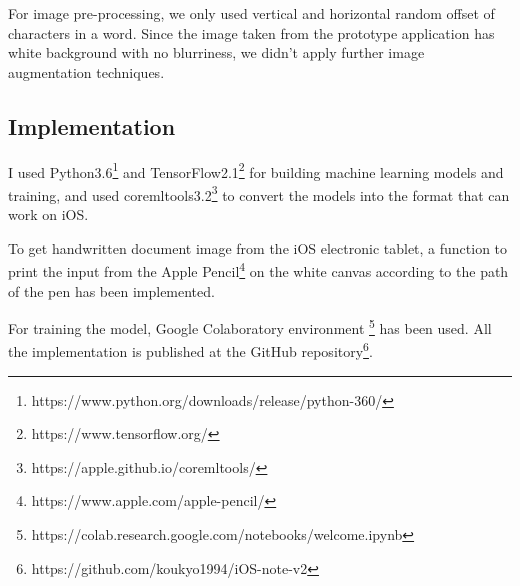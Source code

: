 For image pre-processing, we only used vertical and horizontal random offset of characters in a word.
Since the image taken from the prototype application has white background with no blurriness,
we didn't apply further image augmentation techniques.

\subsection{Implementation}

I used Python3.6\footnote{https://www.python.org/downloads/release/python-360/} and
TensorFlow2.1\footnote{https://www.tensorflow.org/} for building machine learning
models and training, and used coremltools3.2\footnote{https://apple.github.io/coremltools/}
to convert the models into the format that can work on iOS.

To get handwritten document image from the iOS electronic tablet, a function to print
the input from the Apple Pencil\footnote{https://www.apple.com/apple-pencil/} on the white canvas
according to the path of the pen has been implemented.

For training the model, Google Colaboratory environment
\footnote{https://colab.research.google.com/notebooks/welcome.ipynb} has been used.
All the implementation is published at the GitHub repository\footnote{https://github.com/koukyo1994/iOS-note-v2}.
